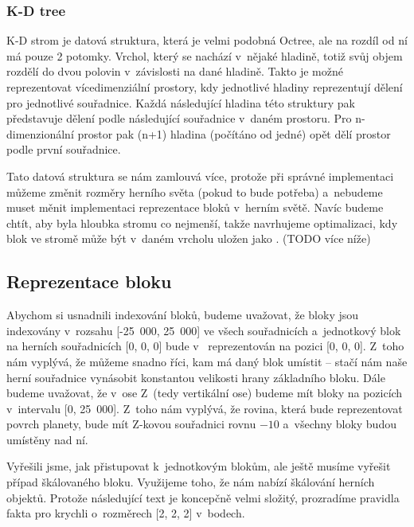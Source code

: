 \subsubsection{K-D tree}
K-D strom je datová struktura, která je velmi podobná Octree, ale na rozdíl od ní má pouze 2 potomky. Vrchol, který se nachází v~nějaké hladině, totiž svůj objem rozdělí do dvou polovin v~závislosti na dané hladině. Takto je možné reprezentovat vícedimenziální prostory, kdy jednotlivé hladiny reprezentují dělení pro jednotlivé souřadnice. Každá následující hladina této struktury pak představuje dělení podle následující souřadnice v~daném prostoru. Pro n-dimenzionální prostor pak (n+1) hladina (počítáno od jedné) opět dělí prostor podle první souřadnice.

Tato datová struktura se nám zamlouvá více, protože při správné implementaci můžeme  změnit rozměry herního světa (pokud to bude potřeba) a~nebudeme muset měnit implementaci reprezentace bloků v~herním světě. Navíc budeme chtít, aby byla hloubka stromu co nejmenší, takže navrhujeme optimalizaci, kdy blok ve stromě může být v~daném vrcholu uložen jako . (TODO více níže)

\subsection{Reprezentace bloku}

Abychom si usnadnili indexování bloků, budeme uvažovat, že bloky jsou indexovány v~rozsahu [-25~000, 25~000] ve všech souřadnicích a~jednotkový blok na herních souřadnicích [0, 0, 0] bude v~\UEu{} reprezentován na pozici [0, 0, 0]. Z~toho nám vyplývá, že můžeme snadno \UEu{} říci, kam má daný blok umístit -- stačí nám naše herní souřadnice vynásobit konstantou velikosti hrany základního bloku. Dále budeme uvažovat, že v~ose Z~(tedy vertikální ose) budeme mít bloky na pozicích v~intervalu [0, 25~000]. Z~toho nám vyplývá, že rovina, která bude reprezentovat povrch planety, bude mít Z-kovou souřadnici rovnu $-10$ a~všechny bloky budou umístěny nad ní.

Vyřešili jsme, jak přistupovat k~jednotkovým blokům, ale ještě musíme vyřešit případ škálovaného bloku. Využijeme toho, že \UE{} nám nabízí škálování herních objektů. Protože následující text je koncepčně velmi složitý, prozradíme pravidla fakta pro krychli o~rozměrech [2, 2, 2] v~bodech.

